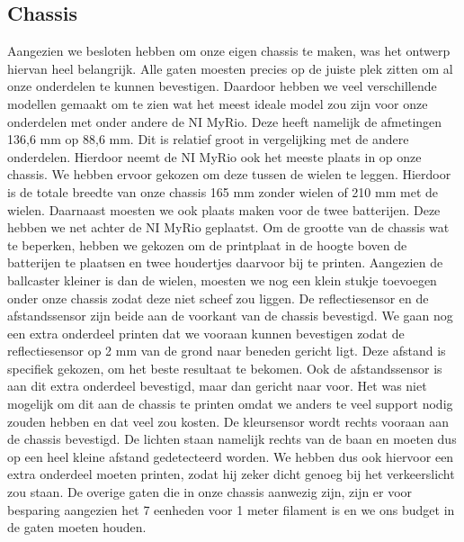 \documentclass[kulak]{kulakarticle} %
\begin{document}
\subsection{Chassis}
Aangezien we besloten hebben om onze eigen chassis te maken, was het ontwerp hiervan heel belangrijk. Alle gaten moesten precies op de juiste plek zitten om al onze onderdelen te kunnen bevestigen. Daardoor hebben we veel verschillende modellen gemaakt om te zien wat het meest ideale model zou zijn voor onze onderdelen met onder andere de NI MyRio. Deze heeft namelijk de afmetingen 136,6 mm op 88,6 mm. Dit is relatief groot in vergelijking met de andere onderdelen. Hierdoor neemt de NI MyRio ook het meeste plaats in op onze chassis. We hebben ervoor gekozen om deze tussen de wielen te leggen. Hierdoor is de totale breedte van onze chassis 165 mm zonder wielen of 210 mm met de wielen. Daarnaast moesten we ook plaats maken voor de twee batterijen. Deze hebben we net achter de NI MyRio geplaatst. Om de grootte van de chassis wat te beperken, hebben we gekozen om de printplaat in de hoogte boven de batterijen te plaatsen en twee houdertjes daarvoor bij te printen. Aangezien de ballcaster kleiner is dan de wielen, moesten we nog een klein stukje toevoegen onder onze chassis zodat deze niet scheef zou liggen. De reflectiesensor en de afstandssensor zijn beide aan de voorkant van de chassis bevestigd. We gaan nog een extra onderdeel printen dat we vooraan kunnen bevestigen zodat de reflectiesensor op 2 mm van de grond naar beneden gericht ligt. Deze afstand is specifiek gekozen, om het beste resultaat te bekomen. Ook de afstandssensor is aan dit extra onderdeel bevestigd, maar dan gericht naar voor. Het was niet mogelijk om dit aan de chassis te printen omdat we anders te veel support nodig zouden hebben en dat veel zou kosten. De kleursensor wordt rechts vooraan aan de chassis bevestigd. De lichten staan namelijk rechts van de baan en moeten dus op een heel kleine afstand gedetecteerd worden. We hebben dus ook hiervoor een extra onderdeel moeten printen, zodat hij zeker dicht genoeg bij het verkeerslicht zou staan. De overige gaten die in onze chassis aanwezig zijn, zijn er voor besparing aangezien het 7 eenheden voor 1 meter filament is en we ons budget in de gaten moeten houden. 
\end{document}
